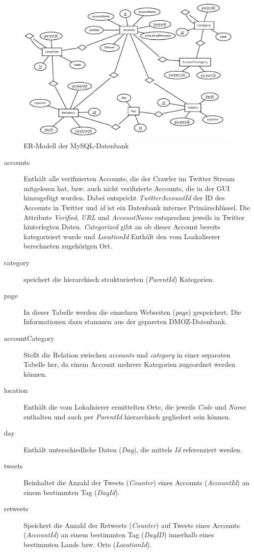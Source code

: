 \begin{figure}[h!]
	\centering
	\includegraphics[width=\textwidth,height=\textheight, keepaspectratio=true]{dia/er}
	\caption{ER-Modell der MySQL-Datenbank}
	\label{fig:mysql-er}
\end{figure}

\begin{description}
	\item[accounts] Enthält alle verifizierten Accounts, die der Crawler im Twitter Stream mitgelesen hat, bzw. auch nicht verifizierte Accounts, die in der GUI hinzugefügt wurden. Dabei entspricht \emph{TwitterAccountId} der ID des Accounts in Twitter und \emph{id} ist ein Datenbank interner Primärschlüssel. Die Attribute \emph{Verified}, \emph{URL} und \emph{AccountName} entsprechen jeweils in Twitter hinterlegten Daten. \emph{Categorized} gibt an ob dieser Account bereits kategorisiert wurde und \emph{LocationId} Enthält den vom Loakaliserer berechneten zugehörigen Ort.
	\item[category] speichert die hierarchisch strukturierten (\emph{ParentId}) Kategorien.
	\item[page] In dieser Tabelle werden die einzelnen Webseiten (\emph{page}) gespeichert. Die Informationen dazu stammen aus der geparsten DMOZ-Datenbank.
	\item[accountCategory] Stellt die Relation zwischen	\emph{accounts} und \emph{category} in einer separaten Tabelle her, da einem Account mehrere Kategorien zugeordnet werden können.
	\item[location] Enthält die vom Lokalisierer ermittelten Orte, die jeweils \emph{Code} und \emph{Name} enthalten und auch per \emph{ParentId} hierarchisch gegliedert sein können.	
	\item[day] Enthält unterschiedliche Daten (\emph{Day}), die mittels \emph{Id} referenziert werden.
	\item[tweets] Beinhaltet die Anzahl der Tweets (\emph{Counter}) eines Accounts (\emph{AccountId}) an einem bestimmten Tag (\emph{DayId}).
	\item[retweets] Speichert die Anzahl der Retweets (\emph{Counter}) auf Tweets eines Accounts (\emph{AccountId}) an einem bestimmten Tag (\emph{DayID}) innerhalb eines bestimmten Lands bzw. Orts (\emph{LocationId}).
\end{description}

